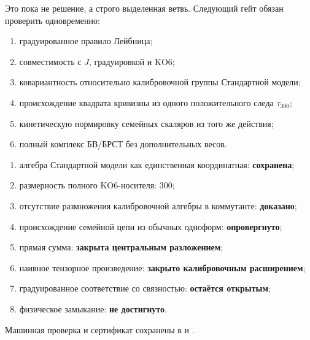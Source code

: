 Это пока не решение, а строго выделенная ветвь. Следующий гейт обязан
проверить одновременно:
\begin{enumerate}
 \item градуированное правило Лейбница;
 \item совместимость с $J$, градуировкой и KO6;
 \item ковариантность относительно калибровочной группы Стандартной модели;
 \item происхождение квадрата кривизны из одного положительного следа
 $\tau_{300}$;
 \item кинетическую нормировку семейных скаляров из того же действия;
 \item полный комплекс БВ/БРСТ без дополнительных весов.
\end{enumerate}

\begin{protocol}
\begin{enumerate}
 \item алгебра Стандартной модели как единственная координатная:
 \textbf{сохранена};
 \item размерность полного KO6-носителя:
 \textbf{$300$};
 \item отсутствие размножения калибровочной алгебры в коммутанте:
 \textbf{доказано};
 \item происхождение семейной цепи из обычных одноформ:
 \textbf{опровергнуто};
 \item прямая сумма:
 \textbf{закрыта центральным разложением};
 \item наивное тензорное произведение:
 \textbf{закрыто калибровочным расширением};
 \item градуированное соответствие со связностью:
 \textbf{остаётся открытым};
 \item физическое замыкание:
 \textbf{не достигнуто}.
\end{enumerate}
\end{protocol}

Машинная проверка и сертификат сохранены в
 и
.